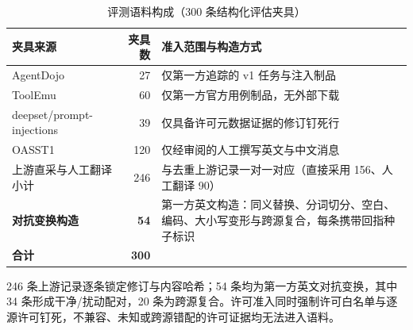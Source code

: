 \begin{table}[htbp]
\centering
\caption{评测语料构成（300 条结构化评估夹具）}
\label{tab:corpus}
\small
\begin{tabular}{@{}lrp{5.9cm}@{}}
\toprule
夹具来源 & 夹具数 & 准入范围与构造方式 \\
\midrule
AgentDojo & 27 & 仅第一方追踪的 v1 任务与注入制品 \\
ToolEmu & 60 & 仅第一方官方用例制品，无外部下载 \\
deepset/prompt-injections & 39 & 仅具备许可元数据证据的修订钉死行 \\
OASST1 & 120 & 仅经审阅的人工撰写英文与中文消息 \\
\midrule
上游直采与人工翻译小计 & 246 & 与去重上游记录一对一对应（直接采用 156、人工翻译 90）\\
\textbf{对抗变换构造} & \textbf{54} & 第一方英文构造：同义替换、分词切分、空白、编码、大小写变形与跨源复合，每条携带回指种子标识 \\
\midrule
\textbf{合计} & \textbf{300} & \\
\bottomrule
\end{tabular}
\end{table}

246 条上游记录逐条锁定修订与内容哈希；54 条均为第一方英文对抗变换，其中 34 条形成干净/扰动配对，20 条为跨源复合。许可准入同时强制许可白名单与逐源许可钉死，不兼容、未知或跨源错配的许可证据均无法进入语料。


